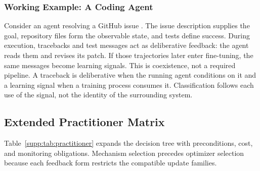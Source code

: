\subsubsection{Working Example: A Coding Agent}
\label{supp:subsubsec:coding-agent}

Consider an agent resolving a GitHub issue \citep{wang2025openhands}. The issue description supplies the goal, repository files form the observable state, and tests define success. During execution, tracebacks and test messages act as deliberative feedback: the agent reads them and revises its patch. If those trajectories later enter fine-tuning, the same messages become learning signals. This is coexistence, not a required pipeline. A traceback is deliberative when the running agent conditions on it and a learning signal when a training process consumes it. Classification follows each use of the signal, not the identity of the surrounding system.

\subsection{Extended Practitioner Matrix}
\label{supp:subsec:practitioner-matrix}

Table~\ref{supp:tab:practitioner} expands the decision tree with preconditions, cost, and monitoring obligations. Mechanism selection precedes optimizer selection because each feedback form restricts the compatible update families.

